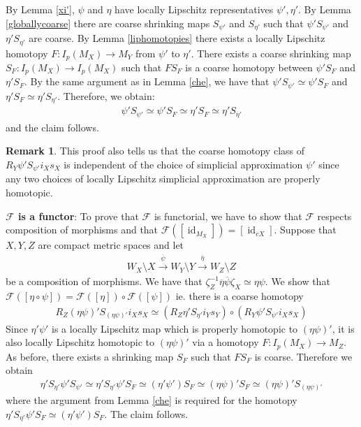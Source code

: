 \documentclass[a4paper,11pt]{article}
\theoremstyle{definition}
\newtheorem*{remark}{Remark}
\theoremstyle{plain}
\theoremstyle{remark}
\DeclareMathOperator{\id}{id}
\begin{document}
{By Lemma \ref{xi'}, $\psi$ and $\eta$ have locally Lipschitz representatives $\psi', \eta'$. By Lemma \ref{globallycoarse} there are coarse shrinking maps $S_{\psi'}$ and $S_{\eta'}$ such that $\psi' S_{\psi'}$ and $\eta' S_{\eta'}$ are coarse. By Lemma \ref{liphomotopies}  there exists a locally Lipschitz homotopy $F: I_{p}(M_{X})\rightarrow M_{Y}$ from $\psi'$ to $\eta'$. There exists a coarse shrinking map $S_{F}: I_{p}(M_{X})\rightarrow I_{p}(M_{X})$ such that $FS_{F}$ is a coarse homotopy between $\psi' S_{F}$ and $\eta' S_{F}$. By the same argument as in Lemma \ref{che}, we have that $\psi' S_{\psi'} \simeq \psi' S_{F}$ and  $\eta' S_{F} \simeq \eta' S_{\eta'}$. Therefore, we obtain: 
\begin{align*}
 \psi' S_{\psi'} \simeq \psi' S_{F}  \simeq \eta' S_{F} \simeq \eta' S_{\eta'}
\end{align*}
and the claim follows. 

\begin{remark} This proof also tells us that the coarse homotopy class of $R_{Y} \psi' S_{\psi'} i_{X}s_{X}$ is independent of the choice of simplicial approximation $\psi'$ since any two choices of locally Lipschitz simplicial approximation are properly homotopic. 
\end{remark}

\textbf{$\mathcal{F}$ is a functor}: To prove that $\mathcal{F}$ is functorial, we have to show that $\mathcal{F}$ respects composition of morphisms and that $\mathcal{F}([\id_{M_{X}}]) = [\id_{cX}]$. Suppose that $X,Y,Z$ are compact metric spaces and let 
\begin{align*}
W_{X}\setminus X \xrightarrow{\overline{\psi}} W_{Y}\setminus Y \xrightarrow{\overline{\eta}} W_{Z} \setminus Z
\end{align*}
be a composition of morphisms. We have that $\zeta^{-1}_{Z}\overline{\eta} \overline{\psi} \zeta_{X} \simeq \eta \psi$. We show that $\mathcal{F}([\eta\circ \psi]) = \mathcal{F}([\eta]) \circ \mathcal{F}([\psi])$ ie. there is a coarse homotopy 
\begin{align*}
R_{Z}(\eta\psi)' S_{(\eta\psi)'} i_{X} s_{X} \simeq (R_{Z} \eta' S_{\eta'} i_{Y} s_{Y}) \circ (R_{Y} \psi' S_{\psi'} i_{X}s_{X})
\end{align*}
Since $\eta' \psi'$ is a locally Lipschitz map which is properly homotopic to $(\eta\psi)'$, it is also locally Lipschitz homotopic to $(\eta \psi)'$ via a homotopy $F: I_{p}(M_{X})\rightarrow M_{Z}$. As before, there exists a shrinking map $S_{F}$ such that $FS_{F}$ is coarse. Therefore we obtain 
\begin{align*}
\eta' S_{\eta'} \psi' S_{\psi'} \simeq \eta' S_{\eta'} \psi' S_{F} \simeq (\eta' \psi') S_{F} \simeq (\eta \psi)' S_{F} \simeq (\eta\psi)' S_{(\eta\psi)'}
\end{align*}
where the argument from Lemma \ref{che} is required for the homotopy $\eta' S_{\eta'} \psi' S_{F} \simeq (\eta' \psi') S_{F}$. The claim follows. \\

}
\end{document}
